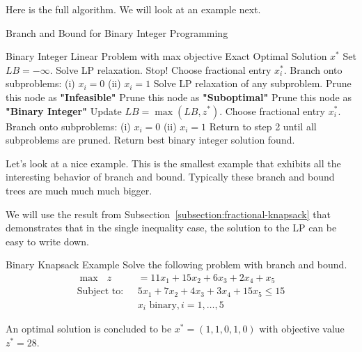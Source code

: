 Here is the full algorithm.  We will look at an example next.
\begin{algorithm}[H]
\caption{Branch and Bound for Binary Integer Programming}\label{alg:branch-and-bound-bip}
\begin{algorithmic}[1]
    \Require Binary Integer Linear Problem with max objective
    \Ensure Exact Optimal Solution $x^*$
    \State Set $LB = - \infty$.
    \State Solve LP relaxation. 
        \State Stop!
    \Else
        \State Choose fractional entry $x_i^*$.
        \State Branch onto subproblems:
        \Statex \hspace{2em} (i) $x_i = 0$
        \Statex \hspace{2em} (ii) $x_i = 1$
    \EndIf
    \State Solve LP relaxation of any subproblem.
        \State Prune this node as \textbf{"Infeasible"}
        \State Prune this node as \textbf{"Suboptimal"}
        \State Prune this node as \textbf{"Binary Integer"}
        \State Update $LB = \max(LB, z^*)$.
    \Else
        \State Choose fractional entry $x_i^*$.
        \State Branch onto subproblems:
        \Statex \hspace{2em} (i) $x_i = 0$
        \Statex \hspace{2em} (ii) $x_i = 1$
        \State Return to step 2 until all subproblems are pruned.
    \EndIf
    \State Return best binary integer solution found.
\end{algorithmic}
\end{algorithm}


Let's look at a nice example.  This is the smallest example that exhibits all the interesting behavior of branch and bound.  Typically these branch and bound trees are much much much bigger.

We will use the result from Subsection~\ref{subsection:fractional-knapsack} that demonstrates that in the single inequality case, the solution to the LP can be easy to write down.

\begin{example}{Binary Knapsack Example}{}
Solve the following problem with branch and bound.
\begin{align*}
\max\ \ \   z&=11x_1+15x_2+6x_3+2x_4 + x_5\\
\text{Subject to:} \ \ \ 	 &5x_1+7x_2+4x_3+3x_4 + 15x_5\leq15\\
		&x_i  \text{  binary},i=1,\dots,5
\end{align*}



An optimal solution is concluded to be $x^* = (1,1,0,1,0)$ with objective value $z^* = 28$.

\end{example}
